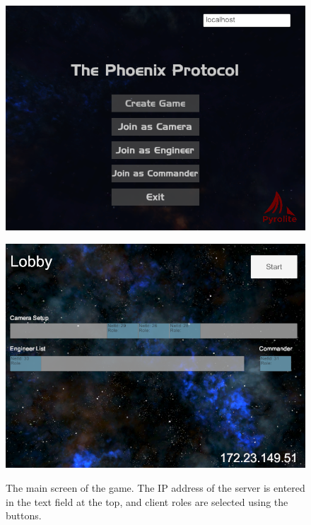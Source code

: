 \documentclass[a4paper,11pt]{article}
\begin{document}
\begin{figure}[ht]
  \centering
  \captionsetup{width=.45\textwidth}
  
  \begin{minipage}{.5\textwidth}
      \centering
      \includegraphics[width=.9\textwidth]{game_first_screen}
      \caption{The main screen of the game. The IP address of the server is entered in the text field at the top, and client roles are selected using the buttons.}
      \label{fig:first_screen}
  \end{minipage}%
  \begin{minipage}{.5\textwidth}
    \centering
    \includegraphics[width=.9\textwidth]{game_lobby_screen}
    \label{fig:lobby_screen}
  \end{minipage}
\end{figure}
\end{document}
